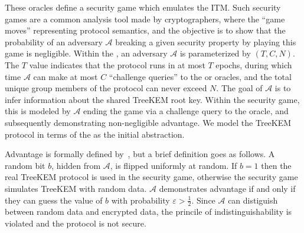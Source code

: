 \documentclass[runningheads]{llncs}
\newcommand{\Abrev}[1]{\gls{#1}}
\newcommand{\Adversary}{\ensuremath{\mathcal{A}}\xspace}
\begin{document}
These oracles define a security game \cite{shoup2004sequences} which emulates the \Abrev{ITM}.
Such security games are a common analysis tool made by cryptographers, where the ``game moves'' representing protocol semantics, and the objective is to show that the probability of an adversary \Adversary  breaking a given security property by playing this game is negligible.
Within the \CGKAsec, an adversary \Adversary is parameterized by \((T, C, N)\).
The \(T\) value indicates that the protocol runs in at most \(T\) epochs, during which time \(\mathcal{A}\) can make at most \(C\) ``challenge queries'' to the  or  oracles, and the total unique group members of the protocol can never exceed \(N\).
The goal of \Adversary is to infer information about the shared TreeKEM root key.
Within the security game, this is modeled by \Adversary  ending the game via a challenge query to the  oracle, 
and subsequently demonstrating non-negligible advantage.
We model the TreeKEM protocol in terms of the \CGKAsec as the initial abstraction.

Advantage is formally defined by~\cite{alwen2020security}, but a brief definition goes as follows.
A random bit $b$, hidden from \Adversary, is flipped uniformly at random.
If $b = 1$ then the real TreeKEM protocol is used in the security game, otherwise the security game simulates TreeKEM with random data.
 \Adversary demonstrates advantage if and only if they can guess the value of $b$ with probability $\varepsilon > \frac{1}{2}$.
Since \Adversary can distiguish between random data and encrypted data, the princile of indistinguishability is violated and the protocol is not secure.



\end{document}
